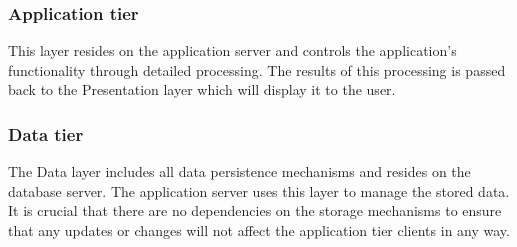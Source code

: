 \subsubsection{Application tier}
This layer resides on the application server and controls the application's functionality through detailed processing. The results of this processing is passed back to the Presentation layer which will display it to the user.

\subsubsection{Data tier}
The Data layer includes all data persistence mechanisms and resides on the database server. The application server uses this layer to manage the stored data. It is crucial that there are no dependencies on the storage mechanisms to ensure that any updates or changes will not affect the application tier clients in any way.
\newpage